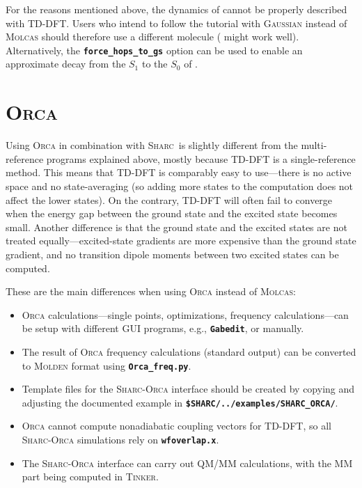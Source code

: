 \documentclass[a4paper,11pt,DIV=15,openany]{scrbook}
\makeatletter
\newcommand{\refermanual}[2][rectangle,draw=B,thick,fill=black!5,inner sep=1pt,outer sep=0pt,rounded corners]{\marginpar{\tikz[baseline=(current bounding box.north)]\node at (0,0) [#1]{\begin{tabular}{@{}l@{}}See\\ section\\ \ref*{#2}\\ (p. \pageref*{#2})\\ in the\\ manual.\end{tabular}};}}
\newcommand{\sharc}{\textsc{Sharc}}
\newcommand{\ttt}[1]{\textbf{\texttt{#1}}}
\makeatother
\begin{document}
For the reasons mentioned above, the dynamics of  cannot be properly described with TD-DFT.
Users who intend to follow the tutorial with \textsc{Gaussian} instead of \textsc{Molcas} should therefore use a different molecule ( might work well).
Alternatively, the \ttt{force\_hops\_to\_gs} option can be used to enable an approximate decay from the $S_1$ to the $S_0$ of  .


\section{\textsc{Orca}}
\refermanual{m-sec:int:orca}

Using \textsc{Orca} in combination with \sharc\ is slightly different from the multi-reference programs explained above, mostly because TD-DFT is a single-reference method.
This means that TD-DFT is comparably easy to use---there is no active space and no state-averaging (so adding more states to the computation does not affect the lower states).
On the contrary, TD-DFT will often fail to converge when the energy gap between the ground state and the excited state becomes small.
Another difference is that the ground state and the excited states are not treated equally---excited-state gradients are more expensive than the ground state gradient, and no transition dipole moments between two excited states can be computed.

These are the main differences when using \textsc{Orca} instead of \textsc{Molcas}:
\begin{itemize}
  \item \textsc{Orca} calculations---single points, optimizations, frequency calculations---can be setup with different GUI programs, e.g., \ttt{Gabedit}, or manually.
  \item The result of \textsc{Orca} frequency calculations (standard output) can be converted to \textsc{Molden} format using \ttt{Orca\_freq.py}.
  \item Template files for the \sharc-\textsc{Orca} interface should be created by copying and adjusting the documented example in \ttt{\$SHARC/../examples/SHARC\_ORCA/}.
  \item \textsc{Orca} cannot compute nonadiabatic coupling vectors for TD-DFT, so all \sharc-\textsc{Orca} simulations rely on \ttt{wfoverlap.x}.
  \item The \sharc-\textsc{Orca} interface can carry out QM/MM calculations, with the MM part being computed in \textsc{Tinker}.
\end{itemize}
\end{document}
